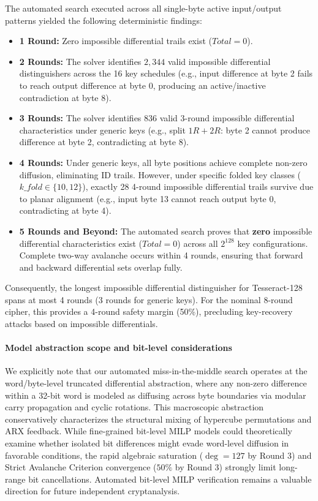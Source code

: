 \documentclass[review,12pt]{elsarticle}
\begin{document}
The automated search executed across all single-byte active input/output patterns yielded the following deterministic findings:
\begin{itemize}
    \item \textbf{1 Round:} Zero impossible differential trails exist ($Total = 0$).
    \item \textbf{2 Rounds:} The solver identifies $2{,}344$ valid impossible differential distinguishers across the 16 key schedules (e.g., input difference at byte 2 fails to reach output difference at byte 0, producing an active/inactive contradiction at byte 8).
    \item \textbf{3 Rounds:} The solver identifies $836$ valid 3-round impossible differential characteristics under generic keys (e.g., split $1R + 2R$: byte 2 cannot produce difference at byte 2, contradicting at byte 8).
    \item \textbf{4 Rounds:} Under generic keys, all byte positions achieve complete non-zero diffusion, eliminating ID trails. However, under specific folded key classes ($\mathit{k\_fold} \in \{10, 12\}$), exactly 28 4-round impossible differential trails survive due to planar alignment (e.g., input byte 13 cannot reach output byte 0, contradicting at byte 4).
    \item \textbf{5 Rounds and Beyond:} The automated search proves that \textbf{zero} impossible differential characteristics exist ($Total = 0$) across all $2^{128}$ key configurations. Complete two-way avalanche occurs within 4 rounds, ensuring that forward and backward differential sets overlap fully.
\end{itemize}
Consequently, the longest impossible differential distinguisher for Tesseract-128 spans at most 4 rounds (3 rounds for generic keys). For the nominal 8-round cipher, this provides a 4-round safety margin (50\%), precluding key-recovery attacks based on impossible differentials.

\paragraph{Model abstraction scope and bit-level considerations}
We explicitly note that our automated miss-in-the-middle search operates at the word/byte-level truncated differential abstraction, where any non-zero difference within a 32-bit word is modeled as diffusing across byte boundaries via modular carry propagation and cyclic rotations. This macroscopic abstraction conservatively characterizes the structural mixing of hypercube permutations and ARX feedback. While fine-grained bit-level MILP models could theoretically examine whether isolated bit differences might evade word-level diffusion in favorable conditions, the rapid algebraic saturation ($\deg = 127$ by Round 3) and Strict Avalanche Criterion convergence ($50\%$ by Round 3) strongly limit long-range bit cancellations. Automated bit-level MILP verification remains a valuable direction for future independent cryptanalysis.
\end{document}
